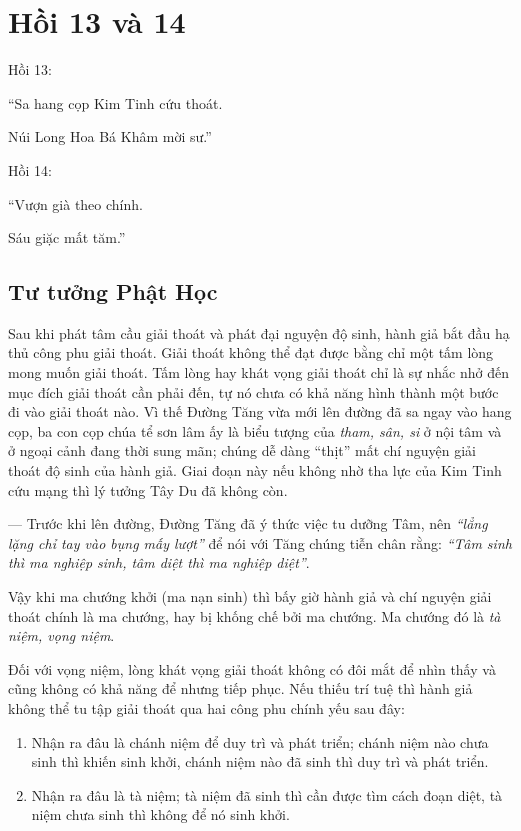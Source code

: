 \chapter{Hồi 13 và 14} %
\label{cha:hoi_13_14}

Hồi 13:

\begin{itshape}
``Sa hang cọp Kim Tinh cứu thoát.

Núi Long Hoa Bá Khâm mời sư.''
\end{itshape}

Hồi 14:

\begin{itshape}
``Vượn già theo chính.

Sáu giặc mất tăm.''
\end{itshape}

\section{Tư tưởng Phật Học} %
\label{sec:13_phat_hoc}

Sau khi phát tâm cầu giải thoát và phát đại nguyện độ sinh, hành giả bắt đầu hạ thủ công phu giải thoát. Giải thoát không thể đạt được bằng chỉ một tấm lòng mong muốn giải thoát. Tấm lòng hay khát vọng giải thoát chỉ là sự nhắc nhở đến mục đích giải thoát cần phải đến, tự nó chưa có khả năng hình thành một bước đi vào giải thoát nào. Vì thế Đường Tăng vừa mới lên đường đã sa ngay vào hang cọp, ba con cọp chúa tể sơn lâm ấy là biểu tượng của \emph{tham, sân, si} ở nội tâm và ở ngoại cảnh đang thời sung mãn; chúng dễ dàng ``thịt'' mất chí nguyện giải thoát độ sinh của hành giả. Giai đoạn này nếu không nhờ tha lực của Kim Tinh cứu mạng thì lý tưởng Tây Du đã không còn.

— Trước khi lên đường, Đường Tăng đã ý thức việc tu dưỡng Tâm, nên \emph{``lẳng lặng chỉ tay vào bụng mấy lượt''} để nói với Tăng chúng tiễn chân rằng: \emph{``Tâm sinh thì ma nghiệp sinh, tâm diệt thì ma nghiệp diệt''}.

Vậy khi ma chướng khởi (ma nạn sinh) thì bấy giờ hành giả và chí nguyện giải thoát chính là ma chướng, hay bị khống chế bởi ma chướng. Ma chướng đó là \emph{tà niệm, vọng niệm}.

Đối với vọng niệm, lòng khát vọng giải thoát không có đôi mắt để nhìn thấy và cũng không có khả năng để nhưng tiếp phục. Nếu thiếu trí tuệ thì hành giả không thể tu tập giải thoát qua hai công phu chính yếu sau đây:

\begin{enumerate}[label=\itshape\arabic*\upshape/]
    \item Nhận ra đâu là chánh niệm để duy trì và phát triển; chánh niệm nào chưa sinh thì khiến sinh khởi, chánh niệm nào đã sinh thì duy trì và phát triển.

    \item Nhận ra đâu là tà niệm; tà niệm đã sinh thì cần được tìm cách đoạn diệt, tà niệm chưa sinh thì không để nó sinh khởi.
\end{enumerate}

